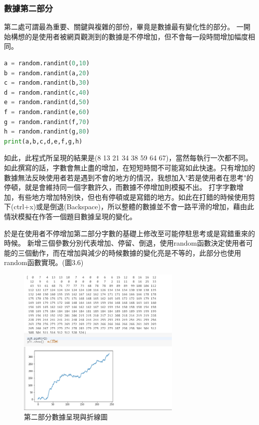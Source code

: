 \subsubsection{數據第二部分}
第二處可謂最為重要、關鍵與複雜的部份，畢竟是數據最有變化性的部分。
一開始構想的是使用者被網頁觀測到的數據是不停增加，但不會每一段時間增加幅度相同。
\begin{lstlisting}[language=Python,caption=python數據第二部分]
a = random.randint(0,10)
b = random.randint(a,20)
c = random.randint(b,30)
d = random.randint(c,40)
e = random.randint(d,50)
f = random.randint(e,60)
g = random.randint(f,70)
h = random.randint(g,80)
print(a,b,c,d,e,f,g,h)
\end{lstlisting}
如此，此程式所呈現的結果是(8 13 21 34 38 59 64 67)，當然每執行一次都不同。
如此撰寫的話，字數會無止盡的增加，在短短時間不可能寫如此快速。只有增加的數據無法反映使用者若是遇到不會的地方的情況，我想加入"若是使用者在思考"的停頓，就是會維持同一個字數許久，而數據不停增加則模擬不出。
打字字數增加，有些地方增加特別快，但也有停頓或是寫錯的地方。如此在打錯的時候使用剪下(ctrl+x)或是倒退(Backspace)，所以整體的數據並不會一路平滑的增加，藉由此情狀模擬在作答一個題目數據呈現的變化。

於是在使用者不停增加第二部分字數的基礎上修改至可能停駐思考或是寫錯重來的時候。
新增三個參數分別代表增加、停留、倒退，使用random函數決定使用者可能的三個動作，而在增加與減少的時候數據的變化亮是不等的，此部分也使用random函數實現。(圖3.6)
\begin{figure}[H] %
	\centering %
	\includegraphics[width=0.7\textwidth]{3_2_1_4.png} %
	\caption{第二部分數據呈現與折線圖} %
	\label{Fig.3.6} %
\end{figure}
